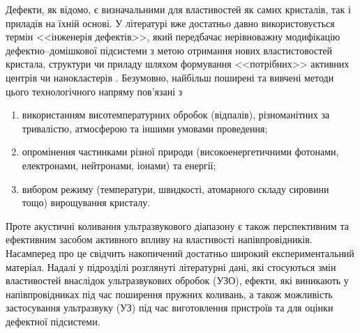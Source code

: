 Дефекти, як відомо, є визначальними для властивостей як самих кристалів, так і приладів на їхній основі.
У літературі вже достатньо давно використовується термін
<<інженерія дефектів>>, який передбачає нерівноважну модифікацію дефектно--домішкової підсистеми з метою отримання нових властистовостей кристала, структури чи приладу шляхом формування <<потрібних>> активних центрів чи нанокластерів \cite{Smirnov}.
Безумовно, найбільш поширені та вивчені методи цього технологічного напряму пов'язані з
\begin{enumerate}[label=\asbuk*),leftmargin=0em,itemindent=1.5em]
\item використанням висотемпературних обробок (відпалів), різноманітних за тривалістю, атмосферою та іншими умовами проведення;
\item опромінення частинками різної природи (високоенергетичними фотонами, електронами, нейтронами, іонами) та енергії;
\item вибором режиму (температури, швидкості, атомарного складу сировини тощо) вирощування кристалу.
\end{enumerate}
Проте акустичні коливання ультразвукового діапазону є також перспективним та ефективним засобом активного впливу на властивості напівпровідників.
Насамперед про це свідчить накопичений достатньо широкий експериментальний матеріал.
Надалі у підрозділі розглянуті літературні дані, які стосуються змін властивостей внаслідок ультразвукових обробок (УЗО), ефекти, які виникають у напівпровідниках під час поширення пружних коливань,
а також можливість застосування ультразвуку (УЗ) під час виготовлення пристроїв та для оцінки дефектної підсистеми.

